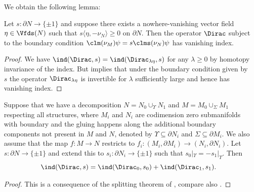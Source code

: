\documentclass[a4paper,11pt]{amsart}
\numberwithin{equation}{section}
\begin{document}
We obtain the following lemma:

\begin{lemma}\label{vectorfield_vanishing_lemma}
    Let \(s \colon \partial N \to \{\pm 1\}\) and suppose there exists a nowhere-vanishing vector field \(\eta \in \Vfds(N)\) such that \(s \langle \eta, -\nu_N \rangle \geq 0\) on \(\partial N\).
    Then the operator \(\Dirac\) subject to the boundary condition \(\clm(\nu_M) \psi = s \clms(\nu_N) \psi \) has vanishing index.
\end{lemma}
\begin{proof}
    We have \(\ind(\Dirac, {s}) = \ind(\Dirac_{\lambda \eta}, s)\) for any \(\lambda \geq 0\) by homotopy invariance of the index.
    But  implies that under the boundary condition given by \(s\) the operator \(\Dirac_{\lambda \eta}\) is invertible for \(\lambda\) sufficiently large and hence has vanishing index.
\end{proof}

\begin{lemma}\label{decomposition_theorem}
    Suppose that we have a decomposition \(N = N_0 \cup_{\Upsilon} N_1\) and \(M = M_0 \cup_{\Sigma} M_1\) respecting all structures, where \(M_i\) and \(N_i\) are codimension zero submanifolds with boundary and the gluing happens along the additional boundary components not present in \(M\) and \(N\), denoted by \(\Upsilon \subseteq \partial N_i\) and \(\Sigma \subseteq \partial M_i\).
    We also assume that the map \(f \colon M \to N\) restricts to \(f_i \colon (M_i, \partial M_i) \to (N_i, \partial N_i)\).
    Let \(s \colon \partial N \to \{\pm 1\}\) and extend this to \(s_i \colon \partial N_i \to \{\pm 1\}\) such that \(s_0|_{\Upsilon} = - s_{1}|_{\Upsilon}\).
    Then
    \[
        \ind(\Dirac, s) = \ind(\Dirac_{0},s_0) + \ind(\Dirac_{1},s_1). 
    \]
\end{lemma}
\begin{proof}
    This is a consequence of the splitting theorem of \textcite[Theorem~6.5]{Baer-Ballmann:Guide-Boundary-value-problems-Dirac}, compare also \cite[Theorem~3.6]{scalar_mean_dirac}.
\end{proof}
\end{document}
